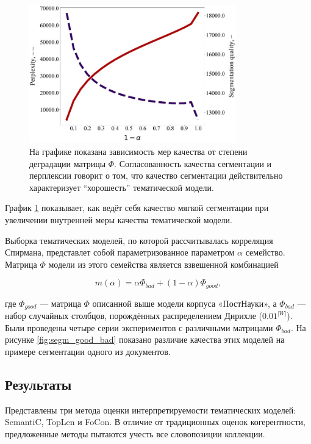 \begin{figure}
    \centering
    \includegraphics[width=0.8\textwidth]{images/segm_1.png}
    \caption{  На графике показана зависимость мер качества от степени деградации матрицы $\Phi$. Согласованность качества сегментации и перплексии говорит о том, что качество сегментации действительно характеризует ``хорошесть'' тематической модели.}
    \label{plot:segm_quality-iteration}
\end{figure}

График \ref{plot:segm_quality-iteration} показывает, как ведёт себя качество мягкой сегментации при увеличении внутренней меры качества тематической модели.

Выборка тематических моделей, по которой рассчитывалась корреляция Спирмана, представлет собой параметризованное параметром $\alpha$ семейство. Матрица $\Phi$ модели из этого семейства является взвешенной комбинацией

\[
m(\alpha) = \alpha \Phi_{bad} + (1-\alpha)\Phi_{good},
\]

где $\Phi_{good}$ --- матрица $\Phi$ описанной выше модели корпуса «ПостНауки», а $\Phi_{bad}$ --- набор случайных столбцов, порождённых распределением Дирихле ($0.01^{|W|}$). Были проведены четыре серии экспериментов с различными матрицами $\Phi_{bad}$. На рисунке \ref{fig:segm_good_bad} показано различие качества этих моделей на примере сегментации одного из документов.

\subsection{Результаты}
Представлены три метода оценки интерпретируемости тематических моделей: SemantiC, TopLen и FoCon. В отличие от традиционных оценок когерентности, предложенные методы пытаются учесть все словопозиции коллекции.

